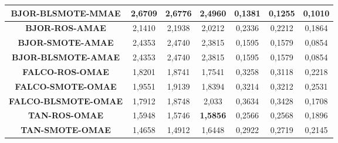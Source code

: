 \begin{table}[H]
{\begin{tabular}{|ccccccc|}
\multicolumn{1}{|c|}{\textbf{BJOR-BLSMOTE-MMAE}}  & \multicolumn{1}{c|}{2,6709}            & \multicolumn{1}{c|}{2,6776}             & \multicolumn{1}{c|}{2,4960}          & \multicolumn{1}{c|}{0,1381}           & \multicolumn{1}{c|}{0,1255}             & 0,1010       \\ \hline \hline
\multicolumn{1}{|c|}{\textbf{BJOR-ROS-AMAE}}      & \multicolumn{1}{c|}{2,1410}           & \multicolumn{1}{c|}{2,1938}             & \multicolumn{1}{c|}{2,0212}          & \multicolumn{1}{c|}{0,2336}           & \multicolumn{1}{c|}{0,2212}             & 0,1864       \\ \hline
\multicolumn{1}{|c|}{\textbf{BJOR-SMOTE-AMAE}}    & \multicolumn{1}{c|}{2,4353}           & \multicolumn{1}{c|}{2,4740}             & \multicolumn{1}{c|}{2,3815}           & \multicolumn{1}{c|}{0,1595}           & \multicolumn{1}{c|}{0,1579}              & 0,0854       \\ \hline
\multicolumn{1}{|c|}{\textbf{BJOR-BLSMOTE-AMAE}}  & \multicolumn{1}{c|}{2,4353}           & \multicolumn{1}{c|}{2,4740}             & \multicolumn{1}{c|}{2,3815}           & \multicolumn{1}{c|}{0,1595}           & \multicolumn{1}{c|}{0,1579}              & 0,0854       \\ \hline \hline
\multicolumn{1}{|c|}{\textbf{FALCO-ROS-OMAE}}     & \multicolumn{1}{c|}{1,8201}           & \multicolumn{1}{c|}{1,8741}             & \multicolumn{1}{c|}{1,7541}          & \multicolumn{1}{c|}{0,3258}            & \multicolumn{1}{c|}{0,3118}             & 0,2218       \\ \hline
\multicolumn{1}{|c|}{\textbf{FALCO-SMOTE-OMAE}}   & \multicolumn{1}{c|}{1,9551}           & \multicolumn{1}{c|}{1,9139}             & \multicolumn{1}{c|}{1,8394}          & \multicolumn{1}{c|}{0,3214}            & \multicolumn{1}{c|}{0,3212}             & 0,2531       \\ \hline
\multicolumn{1}{|c|}{\textbf{FALCO-BLSMOTE-OMAE}} & \multicolumn{1}{c|}{1,7912}           & \multicolumn{1}{c|}{1,8748}             & \multicolumn{1}{c|}{2,033}            & \multicolumn{1}{c|}{0,3634}           & \multicolumn{1}{c|}{0,3428}              & 0,1708       \\ \hline \hline
\multicolumn{1}{|c|}{\textbf{TAN-ROS-OMAE}}       & \multicolumn{1}{c|}{1,5948}           & \multicolumn{1}{c|}{1,5746}             & \multicolumn{1}{c|}{\textbf{1,5856}} & \multicolumn{1}{c|}{0,2566}           & \multicolumn{1}{c|}{0,2568}             & 0,1896        \\ \hline
\multicolumn{1}{|c|}{\textbf{TAN-SMOTE-OMAE}}     & \multicolumn{1}{c|}{1,4658}           & \multicolumn{1}{c|}{1,4912}             & \multicolumn{1}{c|}{1,6448}          & \multicolumn{1}{c|}{0,2922}           & \multicolumn{1}{c|}{0,2719}             & 0,2145       \\ \hline

\end{tabular}}
\end{table}
